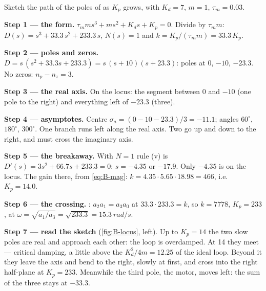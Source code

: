 \begin{example}
\label{ex:B-locus-kp}
Sketch the path of the poles of  as $K_p$ grows, with $K_d = 7$, $m = 1$, $\tau_m = 0.03$.

\textbf{Step 1 — the form.} $\tau_m m s^3 + m s^2 + K_d s + K_p = 0$. Divide by $\tau_m m$: $D(s) = s^3 + 33.3\,s^2 + 233.3\,s$, $N(s) = 1$ and $k = K_p/(\tau_m m) = 33.3\,K_p$.

\textbf{Step 2 — poles and zeros.} $D = s\,(s^2 + 33.3s + 233.3) = s\,(s + 10)(s + 23.3)$: poles at $0$, $-10$, $-23.3$. No zeros: $n_p - n_z = 3$.

\textbf{Step 3 — the real axis.} On the locus: the segment between $0$ and $-10$ (one pole to the right) and everything left of $-23.3$ (three).

\textbf{Step 4 — asymptotes.} Centre $\sigma_a = (0 - 10 - 23.3)/3 = -11.1$; angles $60^\circ$, $180^\circ$, $300^\circ$. One branch runs left along the real axis. Two go up and down to the right, and must cross the imaginary axis.

\textbf{Step 5 — the breakaway.} With $N = 1$ rule (v) is $D'(s) = 3s^2 + 66.7s + 233.3 = 0$: $s = -4.35$ or $-17.9$. Only $-4.35$ is on the locus. The gain there, from \cref{eq:B-mag}: $k = 4.35 \cdot 5.65 \cdot 18.98 = 466$, i.e.\ $K_p = 14.0$.

\textbf{Step 6 — the crossing.} : $a_2a_1 = a_3a_0$ at $33.3 \cdot 233.3 = k$, so $k = 7778$, $K_p = 233$, at $\omega = \sqrt{a_1/a_3} = \sqrt{233.3} = \SI{15.3}{rad/s}$.

\textbf{Step 7 — read the sketch} (\cref{fig:B-locus}, left). Up to $K_p = 14$ the two slow poles are real and approach each other: the loop is overdamped. At 14 they meet — critical damping, a little above the $K_d^2/4m = 12.25$ of the ideal loop. Beyond it they leave the axis and bend to the right, slowly at first, and cross into the right half-plane at $K_p = 233$. Meanwhile the third pole, the motor, moves left: the sum of the three stays at $-33.3$.
\end{example}



